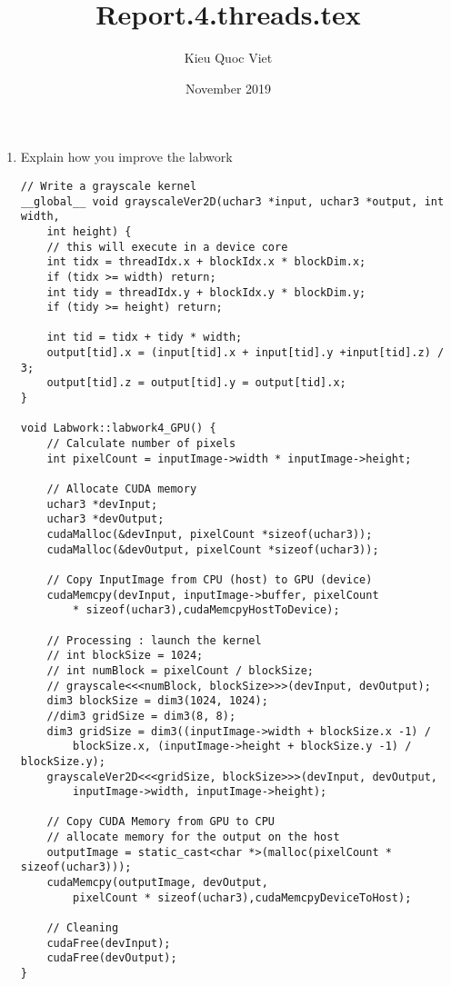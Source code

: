 \documentclass{article}
\title{Report.4.threads.tex}
\author{Kieu Quoc Viet }
\date{November 2019}
\begin{document}
\maketitle

\begin{enumerate}
    \item Explain how you improve the labwork
    
    \begin{verbatim}
// Write a grayscale kernel
__global__ void grayscaleVer2D(uchar3 *input, uchar3 *output, int width, 
    int height) {
    // this will execute in a device core
    int tidx = threadIdx.x + blockIdx.x * blockDim.x;
    if (tidx >= width) return;
    int tidy = threadIdx.y + blockIdx.y * blockDim.y;
    if (tidy >= height) return;

    int tid = tidx + tidy * width;
    output[tid].x = (input[tid].x + input[tid].y +input[tid].z) / 3;
    output[tid].z = output[tid].y = output[tid].x;
}

void Labwork::labwork4_GPU() {
    // Calculate number of pixels
    int pixelCount = inputImage->width * inputImage->height;
 
    // Allocate CUDA memory
    uchar3 *devInput;
    uchar3 *devOutput;
    cudaMalloc(&devInput, pixelCount *sizeof(uchar3));
    cudaMalloc(&devOutput, pixelCount *sizeof(uchar3));

    // Copy InputImage from CPU (host) to GPU (device)
    cudaMemcpy(devInput, inputImage->buffer, pixelCount 
        * sizeof(uchar3),cudaMemcpyHostToDevice);

    // Processing : launch the kernel
    // int blockSize = 1024;
    // int numBlock = pixelCount / blockSize;  
    // grayscale<<<numBlock, blockSize>>>(devInput, devOutput);
    dim3 blockSize = dim3(1024, 1024);
    //dim3 gridSize = dim3(8, 8);
    dim3 gridSize = dim3((inputImage->width + blockSize.x -1) / 
        blockSize.x, (inputImage->height + blockSize.y -1) / blockSize.y);
    grayscaleVer2D<<<gridSize, blockSize>>>(devInput, devOutput, 
        inputImage->width, inputImage->height);

    // Copy CUDA Memory from GPU to CPU
    // allocate memory for the output on the host
    outputImage = static_cast<char *>(malloc(pixelCount * sizeof(uchar3)));  
    cudaMemcpy(outputImage, devOutput, 
        pixelCount * sizeof(uchar3),cudaMemcpyDeviceToHost);   

    // Cleaning
    cudaFree(devInput);
    cudaFree(devOutput);
}
\end{verbatim}
    

\end{enumerate}
\end{document}
